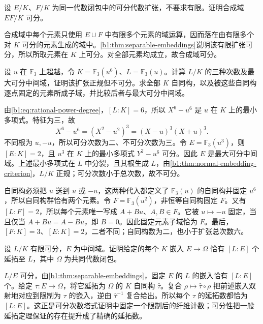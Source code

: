 \begin{exercise}\label{b1:ex:16-13}
	设 \(E/K\)、\(F/K\) 为同一代数闭包中的可分代数扩张，不要求有限。证明合成域 \(EF/K\) 可分。
\end{exercise}
\begin{solution}
	合成域中每个元素只使用 \(E\cup F\) 中有限多个元素的域运算，因而落在由有限多个对 \(K\) 可分的元素生成的域中。\cref{b1:thm:separable-embeddings}说明该有限扩张可分，所以所取元素在 \(K\) 上可分。对全部元素均成立，故合成域可分。
\end{solution}

\begin{exercise}\label{b1:ex:16-14}
	设 \(u\) 在 \(\mathbb F_3\) 上超越，令 \(K=\mathbb F_3(u^6)\)、\(L=\mathbb F_3(u)\)。计算 \(L/K\) 的三种次数及最大可分中间域，证明该扩张正规但不可分。求全部 \(K\) 自同构，以及被这些自同构逐点固定的元素所成子域，并比较后者与最大可分中间域。
\end{exercise}
\begin{solution}
	由\eqref{b1:eq:rational-power-degree}，\([L:K]=6\)，所以 \(X^6-u^6\) 是 \(u\) 在 \(K\) 上的最小多项式。特征为三，故
	\[
		X^6-u^6=(X^2-u^2)^3=(X-u)^3(X+u)^3.
	\]
	不同根为 \(u,-u\)，所以可分次数为二、不可分次数为三。令 \(E=\mathbb F_3(u^3)\)，则 \([E:K]=2\)，且 \(u^3\) 在 \(K\) 上的最小多项式 \(Y^2-u^6\) 可分。因此 \(E\) 是最大可分中间域。上述最小多项式在 \(L\) 中分裂，且其根生成 \(L\)，由\cref{b1:thm:normal-embedding-criterion}，\(L/K\) 正规；可分次数小于总次数，故不可分。

	自同构必须把 \(u\) 送到 \(u\) 或 \(-u\)，这两种代入都定义了 \(\mathbb F_3(u)\) 的自同构并固定 \(u^6\)，所以自同构群恰有两个元素。令 \(F=\mathbb F_3(u^2)\)，非恒等自同构固定 \(F\)。又有 \([L:F]=2\)，所以每个元素唯一写成 \(A+Bu\)、\(A,B\in F\)。它被 \(u\mapsto-u\) 固定，当且仅当 \(A+Bu=A-Bu\)，即 \(B=0\)。因此固定元素子域恰为 \(F\)。最后，\([F:K]=3\)、\([E:K]=2\)，二者不同；自同构数为二，也小于扩张总次数六。
\end{solution}

\begin{exercise}\label{b1:ex:16-15}
	设 \(L/K\) 有限可分，\(E\) 为中间域。证明给定的每个 \(K\) 嵌入 \(E\rightarrow\Omega\) 恰有 \([L:E]\) 个延拓至 \(L\)，其中 \(\Omega\) 为共同代数闭包。
\end{exercise}
\begin{solution}
	\(L/E\) 可分，由\cref{b1:thm:separable-embeddings}，固定 \(E\) 的 \(L\) 的嵌入恰有 \([L:E]\) 个。给定 \(\tau:E\rightarrow\Omega\)，将它延拓为 \(\Omega\) 的 \(K\) 自同构 \(\widehat\tau\)。复合 \(\rho\mapsto\widehat\tau\circ\rho\) 把前述嵌入双射地对应到限制为 \(\tau\) 的嵌入，逆由 \(\widehat\tau^{-1}\) 复合给出。所以每个 \(\tau\) 的延拓数都恰为 \([L:E]\)。这正是可分次数塔式证明中固定一个限制后的纤维计数；可分性把一般延拓定理保证的存在提升成了精确的延拓数。
\end{solution}

